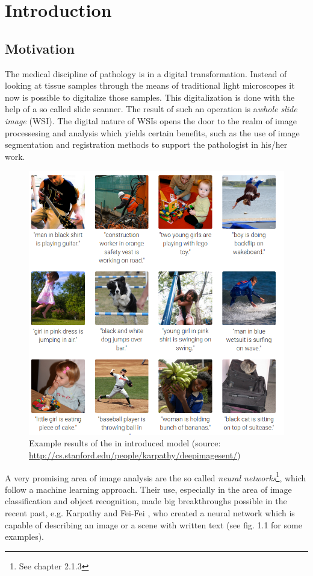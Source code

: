 \chapter{Introduction}

\section{Motivation}
The medical discipline of pathology is in a digital transformation. Instead of looking at tissue samples through the means of traditional light microscopes it now is possible to digitalize those samples. This digitalization is done with the help of a so called slide scanner. The result of such an operation is a\emph{whole slide image} (WSI)\cite{Cornish13}. The digital nature of WSIs opens the door to the realm of image processesing and analysis which yields certain benefits, such as the use of image segmentation and registration methods to support the pathologist in his/her work.
\begin{figure}[ht]
	\begin{center}
		\includegraphics[scale=0.3]{img/deepVisual.png}
		\caption{Example results of the in \cite{Karpathy15} introduced model (source: \url{http://cs.stanford.edu/people/karpathy/deepimagesent/})}
		\label{fig:fig1.1}
	\end{center}
\end{figure}
A very promising area of image analysis are the so called \emph{neural networks}\footnote{See chapter 2.1.3}, which follow a machine learning approach. Their use, especially in the area of image classification and object recognition, made big breakthroughs possible in the recent past, e.g. Karpathy and Fei-Fei \cite{Karpathy15}, who created a neural network which is capable of describing an image or a scene with written text (see fig. 1.1 for some examples).

